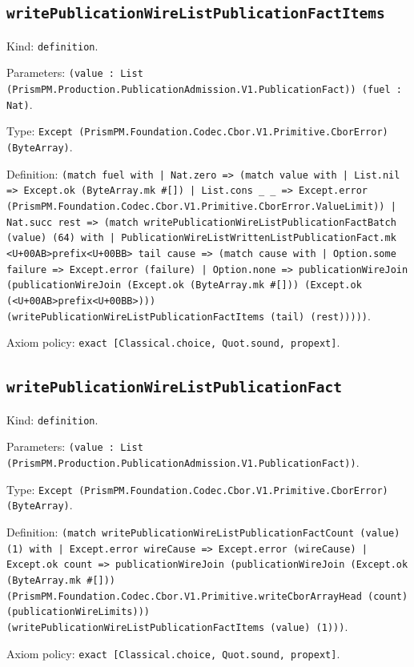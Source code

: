 \documentclass[11pt]{article}
\begin{document}
\subsection*{\texttt{writePublicationWireListPublicationFactItems}}
\noindent Kind: \texttt{definition}.\par
\noindent Parameters: \texttt{(value : List (PrismPM.Production.PublicationAdmission.V1.PublicationFact)) (fuel : Nat)}.\par
\noindent Type: \texttt{Except (PrismPM.Foundation.Codec.Cbor.V1.Primitive.CborError) (ByteArray)}.\par
\noindent Definition: \texttt{(match fuel with | Nat.zero => (match value with | List.nil => Except.ok (ByteArray.mk \#[]) | List.cons \_ \_ => Except.error (PrismPM.Foundation.Codec.Cbor.V1.Primitive.CborError.ValueLimit)) | Nat.succ rest => (match writePublicationWireListPublicationFactBatch (value) (64) with | PublicationWireListWrittenListPublicationFact.mk <U+00AB>prefix<U+00BB> tail cause => (match cause with | Option.some failure => Except.error (failure) | Option.none => publicationWireJoin (publicationWireJoin (Except.ok (ByteArray.mk \#[])) (Except.ok (<U+00AB>prefix<U+00BB>))) (writePublicationWireListPublicationFactItems (tail) (rest)))))}.\par
\noindent Axiom policy: \texttt{exact [Classical.choice, Quot.sound, propext]}.\par
\subsection*{\texttt{writePublicationWireListPublicationFact}}
\noindent Kind: \texttt{definition}.\par
\noindent Parameters: \texttt{(value : List (PrismPM.Production.PublicationAdmission.V1.PublicationFact))}.\par
\noindent Type: \texttt{Except (PrismPM.Foundation.Codec.Cbor.V1.Primitive.CborError) (ByteArray)}.\par
\noindent Definition: \texttt{(match writePublicationWireListPublicationFactCount (value) (1) with | Except.error wireCause => Except.error (wireCause) | Except.ok count => publicationWireJoin (publicationWireJoin (Except.ok (ByteArray.mk \#[])) (PrismPM.Foundation.Codec.Cbor.V1.Primitive.writeCborArrayHead (count) (publicationWireLimits))) (writePublicationWireListPublicationFactItems (value) (1)))}.\par
\noindent Axiom policy: \texttt{exact [Classical.choice, Quot.sound, propext]}.\par
\end{document}
